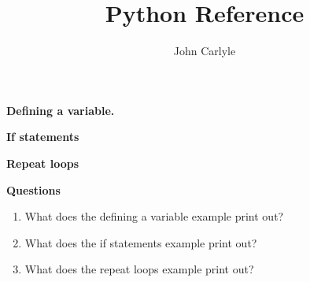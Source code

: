\documentclass{article}
\title{Python Reference}
\author{John Carlyle}
\begin{document}
\maketitle
\lstset{language=Python}


{\noindent\Large\bf Defining a variable.}



\bigskip
{\noindent\Large\bf If statements}



\bigskip
{\noindent\Large\bf Repeat loops}


\bigskip
{\noindent\Large\bf Questions}
\\

\begin{enumerate}

\item What does the defining a variable example print out?
\item What does the if statements example print out?
\item What does the repeat loops example print out?

\end{enumerate}
\end{document}
